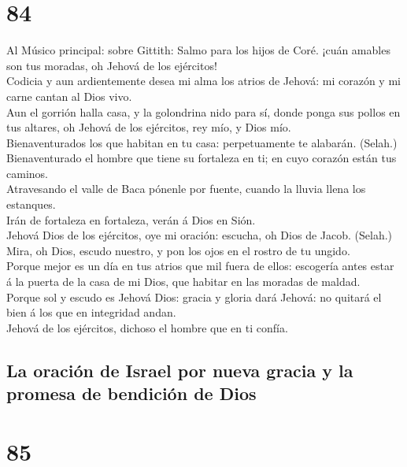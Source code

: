 \hypertarget{section-83}{%
\section{84}\label{section-83}}

 Al Músico principal: sobre Gittith: Salmo para los hijos
de Coré. ¡cuán amables son tus moradas, oh Jehová de los ejércitos!\\
 Codicia y aun ardientemente desea mi alma los atrios de
Jehová: mi corazón y mi carne cantan al Dios vivo.\\
 Aun el gorrión halla casa, y la golondrina nido para sí,
donde ponga sus pollos en tus altares, oh Jehová de los ejércitos, rey
mío, y Dios mío.\\
 Bienaventurados los que habitan en tu casa: perpetuamente
te alabarán. (Selah.)\\
 Bienaventurado el hombre que tiene su fortaleza en ti; en
cuyo corazón están tus caminos.\\
 Atravesando el valle de Baca pónenle por fuente, cuando
la lluvia llena los estanques.\\
 Irán de fortaleza en fortaleza, verán á Dios en Sión.\\
 Jehová Dios de los ejércitos, oye mi oración: escucha, oh
Dios de Jacob. (Selah.)\\
 Mira, oh Dios, escudo nuestro, y pon los ojos en el
rostro de tu ungido.\\
 Porque mejor es un día en tus atrios que mil fuera de
ellos: escogería antes estar á la puerta de la casa de mi Dios, que
habitar en las moradas de maldad.\\
 Porque sol y escudo es Jehová Dios: gracia y gloria dará
Jehová: no quitará el bien á los que en integridad andan.\\
 Jehová de los ejércitos, dichoso el hombre que en ti
confía.

\hypertarget{la-oraciuxf3n-de-israel-por-nueva-gracia-y-la-promesa-de-bendiciuxf3n-de-dios}{%
\subsection{La oración de Israel por nueva gracia y la promesa de
bendición de
Dios}\label{la-oraciuxf3n-de-israel-por-nueva-gracia-y-la-promesa-de-bendiciuxf3n-de-dios}}

\hypertarget{section-84}{%
\section{85}\label{section-84}}

